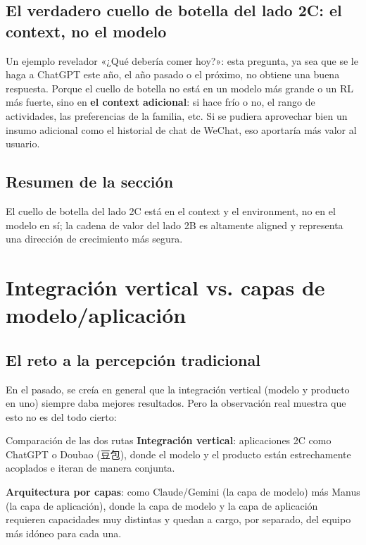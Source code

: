 \documentclass[a4paper]{article}
\begin{document}
\subsection{El verdadero cuello de botella del lado 2C: el context, no el modelo}

\begin{knowledgebox}{Un ejemplo revelador}
«¿Qué debería comer hoy?»: esta pregunta, ya sea que se le haga a ChatGPT este año, el año pasado o el próximo, no obtiene una buena respuesta. Porque el cuello de botella no está en un modelo más grande o un RL más fuerte, sino en \textbf{el context adicional}: si hace frío o no, el rango de actividades, las preferencias de la familia, etc. Si se pudiera aprovechar bien un insumo adicional como el historial de chat de WeChat, eso aportaría más valor al usuario.
\end{knowledgebox}

\subsection{Resumen de la sección}

El cuello de botella del lado 2C está en el context y el environment, no en el modelo en sí; la cadena de valor del lado 2B es altamente aligned y representa una dirección de crecimiento más segura.

\section{Integración vertical vs. capas de modelo/aplicación}

\subsection{El reto a la percepción tradicional}

En el pasado, se creía en general que la integración vertical (modelo y producto en uno) siempre daba mejores resultados. Pero la observación real muestra que esto no es del todo cierto:

\begin{knowledgebox}{Comparación de las dos rutas}
\textbf{Integración vertical}: aplicaciones 2C como ChatGPT o Doubao (豆包), donde el modelo y el producto están estrechamente acoplados e iteran de manera conjunta.

\textbf{Arquitectura por capas}: como Claude/Gemini (la capa de modelo) más Manus (la capa de aplicación), donde la capa de modelo y la capa de aplicación requieren capacidades muy distintas y quedan a cargo, por separado, del equipo más idóneo para cada una.
\end{knowledgebox}
\end{document}
